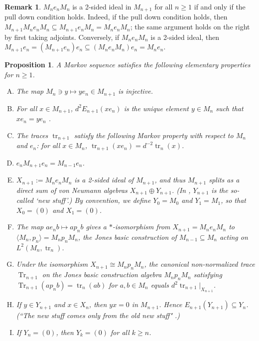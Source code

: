 \documentclass[11pt]{article}
\theoremstyle{plain}
\newtheorem{prop}[thm]{Proposition}
\theoremstyle{definition}
\newtheorem{rem}[thm]{Remark}
\DeclareMathOperator{\Tr}{Tr}
\DeclareMathOperator{\tr}{tr}
\begin{document}
\begin{rem}\label{pulldowniff}
$M_n e_n M_n$ is a 2-sided ideal in $M_{n+1}$ for all $n\geq 1$ if and only if the pull down condition holds. Indeed, if the pull down condition holds, then $M_{n+1} M_n e_n M_n \subseteq M_{n+1} e_n M_n = M_n e_n M_n$; the same argument holds on the right by first taking adjoints. Conversely, if $M_n e_n M_n$ is a 2-sided ideal, then $M_{n+1} e_n = (M_{n+1} e_n)e_n \subseteq (M_n e_n M_n) e_n = M_n e_n$.
\end{rem}




\begin{prop}\label{prop:ElementaryMarkov} A Markov sequence satisfies the following elementary properties for $n\geq 1$.
\begin{enumerate}[(A)]
\item
\label{EP:Injective}
The map $M_{n}\ni y\mapsto ye_n \in M_{n+1}$ is injective.

\item
\label{EP:UniquePullDown}
For all $x\in M_{n+1}$, $d^{2}E_{n+1}(x e_n)$ is the unique element $y\in M_n$ such that $x e_n = ye_n$ \cite[Lem.~1.2]{MR860811}.

\item
\label{EP:MarkovTraces}
The traces $\tr_{n+1}$ satisfy the following \emph{Markov property} with respect to $M_n$ and $e_n$: for all $x\in M_n$, $\tr_{n+1}(xe_n) = d^{-2} \tr_n(x)$.

\item
\label{EP:CompressM_{n+1}}
$e_n M_{n+1}e_n = M_{n-1}e_n$.

\item
\label{EP:2SidedIdeal}
$X_{n+1}:=M_n e_n M_n$ is a 2-sided ideal of $M_{n+1}$, and thus $M_{n+1}$ splits as a direct sum of von Neumann algebras $X_{n+1}\oplus Y_{n+1}$.
(In \cite[Thm.~4.1.4 and Thm.~4.6.3]{MR999799}, $Y_{n+1}$ is the so-called `new stuff'.)
By convention, we define $Y_0 = M_0$ and $Y_1 = M_1$, so that $X_0 = (0)$ and $X_1 = (0)$.

\item
\label{EP:BasicContruction}
The map $ae_n b\mapsto ap_n b$ gives a $*$-isomorphism from $X_{n+1}=M_n e_n M_n$ to $\langle M_n , p_n\rangle=M_np_nM_n$, the Jones basic construction of $M_{n-1} \subseteq M_n$ acting on $L^2(M_n,\tr_n)$.

\item
\label{EP:OtherMarkovDef}
Under the isomorphism $X_{n+1} \cong M_n p_n M_n$, the canonical non-normalized trace $\Tr_{n+1}$ on the Jones basic construction algebra $M_np_nM_n$ satisfying $\Tr_{n+1}(ap_nb) = \tr_n(ab)$ for $a,b\in M_n$ equals $d^2 \tr_{n+1}|_{X_{n+1}}$.

\item
\label{EP:NewStuff}
If $y\in Y_{n+1}$ and $x\in X_{n}$, then $yx = 0$ in $M_{n+1}$.
Hence $E_{n+1}(Y_{n+1}) \subseteq Y_{n}$.
(``The new stuff comes only from the old new stuff" \cite{MR999799}.)

\item
\label{EP:FiniteDepth}
If $Y_n =(0)$, then $Y_{k} = (0)$ for all $k\geq n$.

\end{enumerate}
\end{prop}
\end{document}
